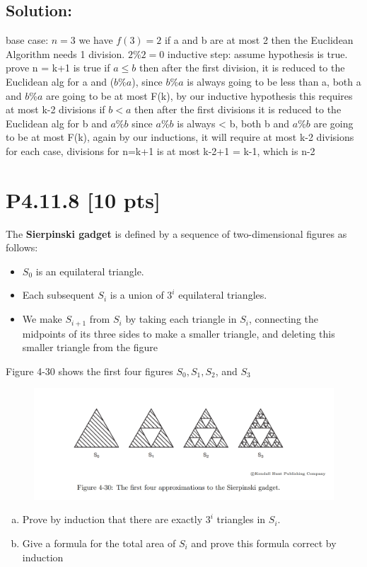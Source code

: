 \documentclass[12pt]{article}
\begin{document}
\subsection*{\textbf{Solution:}}
base case: $n=3$ we have $f(3) = 2$ if a and b are at most 2 then the Euclidean Algorithm needs 1 division. $2\%2 = 0$
\newline inductive step: assume hypothesis is true.
\newline prove n = k+1 is true 
\newline if $a \le b$ then after the first division, it is reduced to the Euclidean alg for a and ($b\%a$), since $b\%a$ is always going to be less than a, both a and $b\%a$ are going to be at most F(k), by our inductive hypothesis this requires at most k-2 divisions
\newline if $b<a$ then after the first divisions it is reduced to the Euclidean alg for b and $a\%b$ since $a\%b$ is always < b, both b and $a\%b$ are going to be at most F(k), again by our inductions, it will require at most k-2 divisions
\newline for each case, divisions for n=k+1 is at most k-2+1 = k-1, which is n-2

\newpage
\section*{\textbf{P4.11.8} [10 pts]}
 The \textbf{Sierpinski gadget} is defined by a sequence of two-dimensional figures as follows: 
\begin{itemize}
    \item $S_0$ is an equilateral triangle.

    \item Each subsequent $S_i$ is a union of $3^i$ equilateral triangles.

    \item  We make $S_{i+1}$ from $S_i$ by taking each triangle in $S_i$, connecting the midpoints of its three sides to make a smaller triangle, and deleting this smaller triangle from the figure

\end{itemize}
 Figure 4-30 shows the first four figures $S_0, S_1, S_2$, and $S_3$
\begin{figure}[ht]
    \centering
    \includegraphics[width=0.75\linewidth]{4-30.png}
\end{figure}
\begin{enumerate}[(a)]
    \item Prove by induction that there are exactly $3^i$ triangles in $S_i$.

    \item Give a formula for the total area of $S_i$ and prove this formula correct by induction
    
\end{enumerate}
\end{document}
